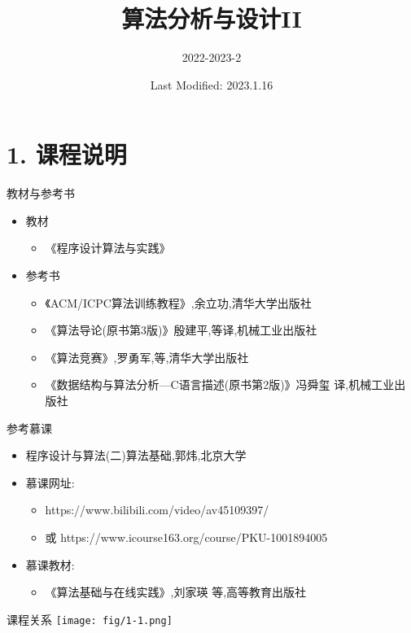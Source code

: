 \documentclass{beamer}
\title{算法分析与设计II}
\subtitle{2022-2023-2}
\date{Last Modified: 2023.1.16}
\institute{\vspace{2em} 数学与计算机学院 \\ 数据科学与大数据技术}
\begin{document}
\frame{\titlepage}

\section{1. 课程说明}
\begin{frame}{教材与参考书}
    \begin{itemize}
        \item 教材
        \begin{itemize}
            \item《程序设计算法与实践》
        \end{itemize}
        \item 参考书
        \begin{itemize}
            \item 《ACM/ICPC算法训练教程》,余立功,清华大学出版社
            \item 《算法导论(原书第3版)》殷建平,等译,机械工业出版社
            \item 《算法竞赛》,罗勇军,等,清华大学出版社
            \item 《数据结构与算法分析—C语言描述(原书第2版)》冯舜玺 译,机械工业出版社
        \end{itemize}
    \end{itemize}
\end{frame}
\begin{frame}{参考慕课}
    \begin{itemize}
        \item 程序设计与算法(二)算法基础,郭炜,北京大学
        \item 慕课网址:
        \begin{itemize}
            \item https://www.bilibili.com/video/av45109397/
            \item 或 https://www.icourse163.org/course/PKU-1001894005
        \end{itemize}
        \item 慕课教材:
        \begin{itemize}
            \item 《算法基础与在线实践》,刘家瑛 等,高等教育出版社
        \end{itemize}
    \end{itemize}
\end{frame}
\begin{frame}{课程关系}
    \texttt{[image: fig/1-1.png]}
\end{frame}
\end{document}
